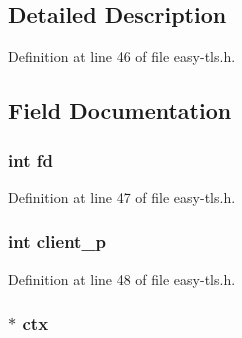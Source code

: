 \subsection{Detailed Description}


Definition at line 46 of file easy-\/tls.\+h.



\subsection{Field Documentation}
\subsubsection[{\texorpdfstring{fd}{fd}}]{\setlength{\rightskip}{0pt plus 5cm}int fd}\hypertarget{structtls__start__proxy__args_a6f8059414f0228f0256115e024eeed4b}{}\label{structtls__start__proxy__args_a6f8059414f0228f0256115e024eeed4b}


Definition at line 47 of file easy-\/tls.\+h.

\subsubsection[{\texorpdfstring{client\+\_\+p}{client_p}}]{\setlength{\rightskip}{0pt plus 5cm}int client\+\_\+p}\hypertarget{structtls__start__proxy__args_ab34c46dc01ec481d13f7bfad0044e34c}{}\label{structtls__start__proxy__args_ab34c46dc01ec481d13f7bfad0044e34c}


Definition at line 48 of file easy-\/tls.\+h.

\subsubsection[{\texorpdfstring{ctx}{ctx}}]{$\ast$ ctx}\hypertarget{structtls__start__proxy__args_ad5433bcc8a463fb4df3ce5912bb11fe3}{}\label{structtls__start__proxy__args_ad5433bcc8a463fb4df3ce5912bb11fe3}


